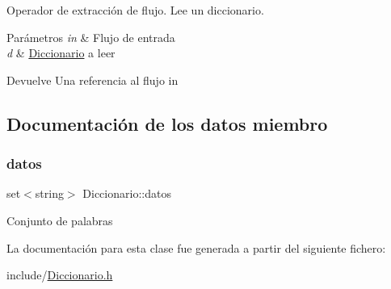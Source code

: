 Operador de extracción de flujo. Lee un diccionario. 


\begin{DoxyParams}{Parámetros}
{\em in} & Flujo de entrada \\
\hline
{\em d} & \hyperlink{classDiccionario}{Diccionario} a leer \\
\hline
\end{DoxyParams}
\begin{DoxyReturn}{Devuelve}
Una referencia al flujo in 
\end{DoxyReturn}


\subsection{Documentación de los datos miembro}
\mbox{\label{classDiccionario_aae047bbcc9d6bc3c7b0b2c308d39048d}} 
\subsubsection{\texorpdfstring{datos}{datos}}
{\footnotesize\ttfamily set$<$string$>$ Diccionario\+::datos\hspace{0.3cm}{\ttfamily [private]}}

Conjunto de palabras 

La documentación para esta clase fue generada a partir del siguiente fichero\+:\begin{DoxyCompactItemize}
\item 
include/\hyperlink{Diccionario_8h}{Diccionario.\+h}\end{DoxyCompactItemize}
